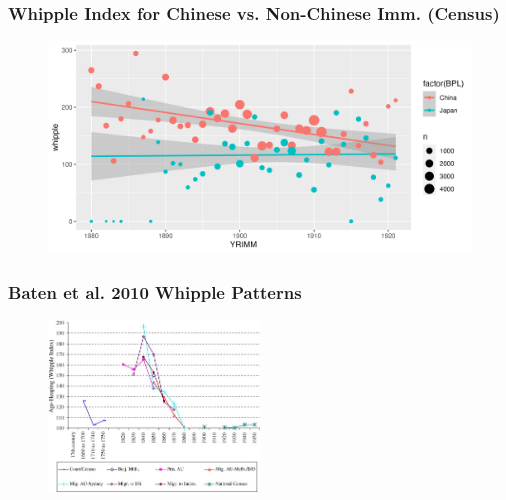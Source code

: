 \documentclass[xcolor=dvipsnames, compress, 12pt, aspectratio=169, handout]{beamer}
\begin{document}
\begin{frame}
    \label{whippleplot3_census}
    \frametitle{Whipple Index for Chinese vs. Non-Chinese Imm. (Census) \hyperlink{whipple}{}}
    \begin{figure}
        \centering
        \includegraphics[width=\textwidth]{../../figs/5oct23/whippleplot3_census.png}
    \end{figure}
\end{frame}

\begin{frame}
    \frametitle{Baten et al. 2010 Whipple Patterns \hyperlink{whipple}{}}
    \label{batenwhipple}
    \begin{figure}
        \centering
        \includegraphics[width=0.5\textwidth]{../../figs/5oct23/batenetal2010_whipple.jpg}
    \end{figure}
\end{frame}
\end{document}
